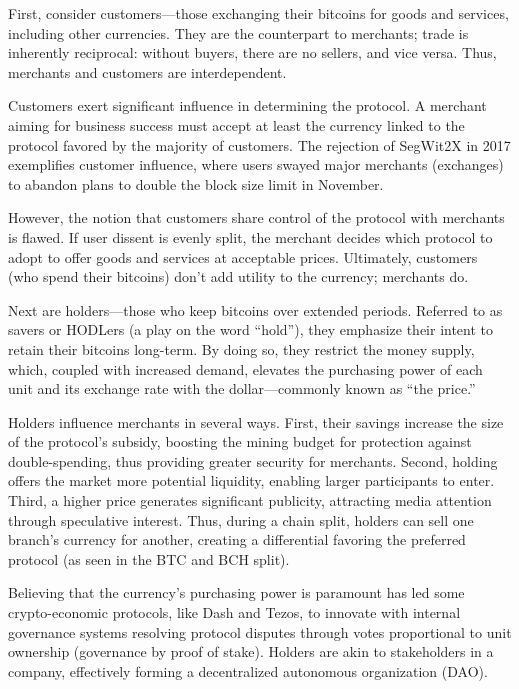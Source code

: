 \documentclass[
  a5paper,
  smalldemyvopaper,10pt,twoside,onecolumn,openright,extrafontsizes,hidelinks]{memoir}
\begin{document}
First, consider customers---those exchanging their bitcoins for goods
and services, including other currencies. They are the counterpart to
merchants; trade is inherently reciprocal: without buyers, there are no
sellers, and vice versa. Thus, merchants and customers are
interdependent.

Customers exert significant influence in determining the protocol. A
merchant aiming for business success must accept at least the currency
linked to the protocol favored by the majority of customers. The
rejection of SegWit2X in 2017 exemplifies customer influence, where
users swayed major merchants (exchanges) to abandon plans to double the
block size limit in November.

However, the notion that customers share control of the protocol with
merchants is flawed. If user dissent is evenly split, the merchant
decides which protocol to adopt to offer goods and services at
acceptable prices. Ultimately, customers (who spend their bitcoins)
don't add utility to the currency; merchants do.

Next are holders---those who keep bitcoins over extended periods.
Referred to as savers or HODLers (a play on the word ``hold''), they
emphasize their intent to retain their bitcoins long-term. By doing so,
they restrict the money supply, which, coupled with increased demand,
elevates the purchasing power of each unit and its exchange rate with
the dollar---commonly known as ``the price.''

Holders influence merchants in several ways. First, their savings
increase the size of the protocol's subsidy, boosting the mining budget
for protection against double-spending, thus providing greater security
for merchants. Second, holding offers the market more potential
liquidity, enabling larger participants to enter. Third, a higher price
generates significant publicity, attracting media attention through
speculative interest. Thus, during a chain split, holders can sell one
branch's currency for another, creating a differential favoring the
preferred protocol (as seen in the BTC and BCH split).

Believing that the currency's purchasing power is paramount has led some
crypto-economic protocols, like Dash and Tezos, to innovate with
internal governance systems resolving protocol disputes through votes
proportional to unit ownership (governance by proof of stake). Holders
are akin to stakeholders in a company, effectively forming a
decentralized autonomous organization (DAO).
\end{document}
